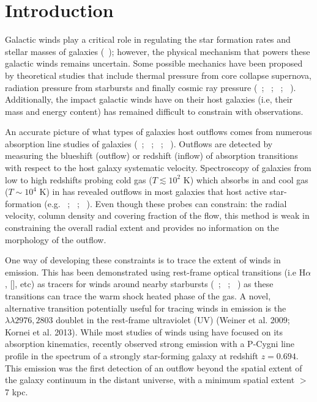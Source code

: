 \documentclass[twocolumn]{aastex61}
\newcommand{\citeth}[1]{(\citeauthor{#1}\ \citeyear{#1})}
\newcommand{\citethnop}[1]{\citeauthor{#1}\ \citeyear{#1}}
\begin{document}

\section{Introduction}\label{sec:intro}
Galactic winds play a critical role in regulating the star formation rates and stellar masses of galaxies \citeth{Werk_2014}; however, the physical mechanism that powers these galactic winds remains uncertain. Some possible mechanics have been proposed by theoretical studies that include thermal pressure from core collapse supernova, radiation pressure from starbursts and finally cosmic ray pressure (\citethnop{Larson_1974}; \citethnop{Chevalier_1985}; \citethnop{Springel_2003}; \citethnop{Sugahara_2017}). Additionally, the impact galactic winds have on their host galaxies (i.e, their mass and energy content) has remained difficult to constrain with observations.

An accurate picture of what types of galaxies host outflows comes from numerous absorption line studies of galaxies (\citethnop{Veilleux2005}; \citethnop{Weiner2009}; \citethnop{Martin2012}; \citethnop{Rubin_2014}). Outflows are detected by measuring the blueshift (outflow) or redshift (inflow) of absorption transitions with respect to the host galaxy systematic velocity. Spectroscopy of galaxies from low to high redshifts probing cold gas ($T \lesssim 10^2$ K) which absorbs in  and cool gas ($T \sim 10^4$ K) in  has revealed outflows in most galaxies that host active star-formation (e.g. \citethnop{chen2010}; \citethnop{Martin2012}; \citethnop{Rubin_2014}). Even though these probes can constrain: the radial velocity, column density and covering fraction of the flow, this method is weak in constraining the overall radial extent and provides no information on the morphology of the outflow.

One way of developing these constraints is to trace the extent of winds in emission. This has been demonstrated using rest-frame optical transitions (i.e H$\alpha$, [], etc) as tracers for winds around nearby starbursts (\citethnop{Matsubayashi2009}; \citethnop{Veilleux2009}; \citethnop{Tripp2011}) as these transitions can trace the warm shock heated phase of the gas. 
A novel, alternative transition potentially useful for tracing winds in emission is the  $\lambda\lambda 2976,2803$ doublet in the rest-frame ultraviolet (UV)
(Weiner et al. 2009; Kornei et al. 2013)\nocite{Weiner2009, Kornei2013}. While most studies of winds using  have focused on its absorption kinematics, \cite{Rubin_2011}  recently observed  strong  emission with a P-Cygni line profile in the spectrum of a strongly star-forming galaxy at redshift $z = 0.694$.  This emission was the first detection of an outflow beyond the spatial extent of the galaxy continuum in the distant universe, with a minimum spatial extent  $>$ 7 kpc.
\end{document}

